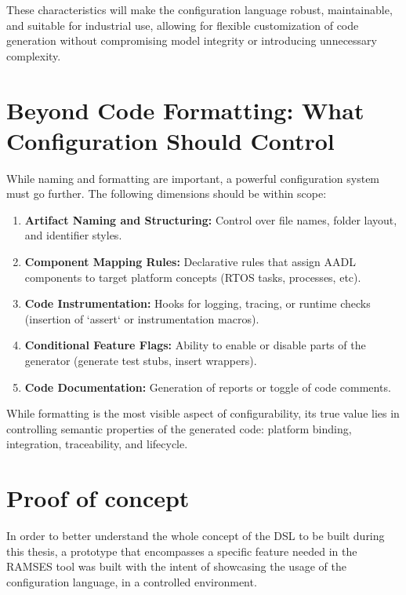 These characteristics will make the configuration language robust, maintainable, and suitable for industrial use, allowing for flexible customization of code generation without compromising model integrity or introducing unnecessary complexity.

\section{Beyond Code Formatting: What Configuration Should Control}
\label{sec:config_scope}

While naming and formatting are important, a powerful configuration system must go further. The following dimensions should be within scope:

\begin{enumerate}
	\item \textbf{Artifact Naming and Structuring:} Control over file names, folder layout, and identifier styles.
	\item \textbf{Component Mapping Rules:} Declarative rules that assign AADL components to target platform concepts (RTOS tasks, processes, etc).
	\item \textbf{Code Instrumentation:} Hooks for logging, tracing, or runtime checks (insertion of `assert` or instrumentation macros).
	\item \textbf{Conditional Feature Flags:} Ability to enable or disable parts of the generator (generate test stubs, insert wrappers).
	\item \textbf{Code Documentation:} Generation of reports or toggle of code comments.
\end{enumerate}

\begin{tcolorbox}[colback=blue!5, colframe=blue!50!black, title=Configuration is More Than Style]
	While formatting is the most visible aspect of configurability, its true value lies in controlling semantic properties of the generated code: platform binding, integration, traceability, and lifecycle.
\end{tcolorbox}

\section{Proof of concept}
\label{sec:proof_of_concept}

In order to better understand the whole concept of the \gls{DSL} to be built during this thesis, a prototype that encompasses a specific feature needed in the \gls{RAMSES} tool was built with the intent of showcasing the usage of the configuration language, in a controlled environment.

